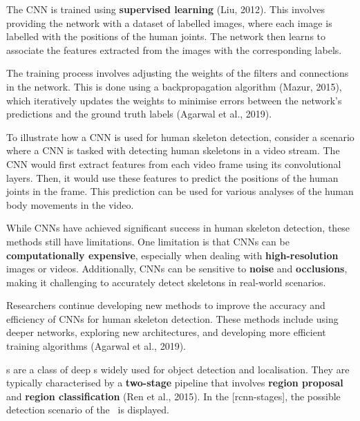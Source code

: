 The CNN is trained using {\bf supervised learning} (\scc Liu, 2012). This involves providing the network with a dataset of labelled images, where each image is labelled with the positions of the human joints. The network then learns to associate the features extracted from the images with the corresponding labels.

The training process involves adjusting the weights of the filters and connections in the network. This is done using a backpropagation algorithm (\scc Mazur, 2015), which iteratively updates the weights to minimise errors between the network's predictions and the ground truth labels (\scc Agarwal et al., 2019).


To illustrate how a CNN is used for human skeleton detection, consider a scenario where a CNN is tasked with detecting human skeletons in a video stream. The CNN would first extract features from each video frame using its convolutional layers. Then, it would use these features to predict the positions of the human joints in the frame. This prediction can be used for various analyses of the human body movements in the video.


While CNNs have achieved significant success in human skeleton detection, these methods still have limitations. One limitation is that CNNs can be {\bf computationally expensive}, especially when dealing with {\bf high-resolution} images or videos. Additionally, CNNs can be sensitive to {\bf noise} and {\bf occlusions}, making it challenging to accurately detect skeletons in real-world scenarios.

Researchers continue developing new methods to improve the accuracy and efficiency of CNNs for human skeleton detection. These methods include using deeper networks, exploring new architectures, and developing more efficient training algorithms (\scc Agarwal et al., 2019).

\RCNN\-s are a class of deep \CNN\-s widely used for object detection and localisation. They are typically characterised by a {\bf two-stage} pipeline that involves {\bf region proposal} and {\bf region classification} (\scc Ren et al., 2015). In the [rcnn-stages], the possible detection scenario of the \RCNN\ is displayed.

